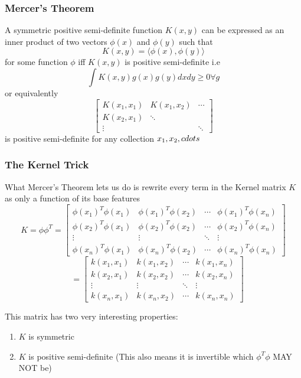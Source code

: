 \documentclass[hidelinks]{book}
\numberwithin{equation}{section}
\begin{document}
  \subsubsection{Mercer's Theorem}
  A symmetric positive semi-definite function $K(x, y)$ can be expressed as an inner product of two vectors $\phi(x)$ and $\phi(y)$ such that
  $$ K(x, y) = \langle \phi(x), \phi(y) \rangle $$ for some function $\phi$ iff
  $K(x,y)$ is positive semi-definite i.e
  $$ \int K(x, y) g(x) g(y) dx dy \geq 0 \forall g $$ or equivalently
  $$ \begin{bmatrix} K(x_1, x_1) & K(x_1, x_2) & \cdots \\ K(x_2, x_1) & \ddots
  & \\ \vdots & & \ddots \end{bmatrix} $$ is positive semi-definite for any
  collection ${x_1, x_2, \\cdots}$

  \subsubsection{The Kernel Trick}
  What Mercer's Theorem lets us do is rewrite every term in the Kernel matrix
  $K$ as only a function of its base features $$ K = \phi \phi^T = \begin{bmatrix}
  \phi(x_1)^T \phi(x_1) & \phi(x_1)^T \phi(x_2) & \cdots & \phi(x_1)^T \phi(x_n)
  \\ \phi(x_2)^T \phi(x_1) & \phi(x_2)^T \phi(x_2) & \cdots & \phi(x_2)^T \phi(x_n)
  \\ \vdots & \vdots & \ddots & \vdots \\ \phi(x_n)^T \phi(x_1) & \phi(x_n)^T \phi(x_2)
  & \cdots & \phi(x_n)^T \phi(x_n) \end{bmatrix}$$
  $$ \quad = \begin{bmatrix}
  k(x_1, x_1) & k(x_1, x_2) & \cdots & k(x_1, x_n) \\ k(x_2, x_1) & k(x_2, x_2)
  & \cdots & k(x_2, x_n) \\ \vdots & \vdots & \ddots & \vdots \\ k(x_n, x_1) &
  k(x_n, x_2) & \cdots & k(x_n, x_n) \end{bmatrix} $$

  This matrix has two very interesting properties:
  \begin{enumerate}
  \item $K$ is symmetric
  \item $K$ is positive semi-definite (This also means it is invertible which $\phi^T \phi$ MAY NOT be)
  \end{enumerate}
\end{document}
